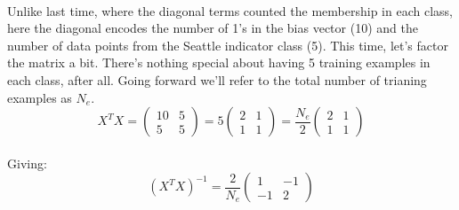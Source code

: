 \\
Unlike last time, where the diagonal terms counted the membership in each class,
here the diagonal encodes the number of 1's in the bias vector (10) and the
number of data points from the Seattle indicator class (5).  This time, let's
factor the matrix a bit.  There's nothing special about having 5 training
examples in each class, after all. Going forward we'll refer to the total number
of trianing examples as $N_e$.
\\
\begin{equation}
X^T X =
\left(\begin{array}{cc}
          10 & 5 \\
          5  & 5 
\end{array}\right)
= 5
\left(\begin{array}{cc}
          2 & 1 \\
          1 & 1 
\end{array}\right)
= \frac{N_e}{2}
\left(\begin{array}{cc}
          2 & 1 \\
          1 & 1 
\end{array}\right)
\end{equation}
\\
Giving:
\begin{equation}
(X^T X)^{-1} = \frac{2}{N_e}
\left(\begin{array}{cc}
          1  & -1 \\
         -1  &  2 
\end{array}\right)
\end{equation}

